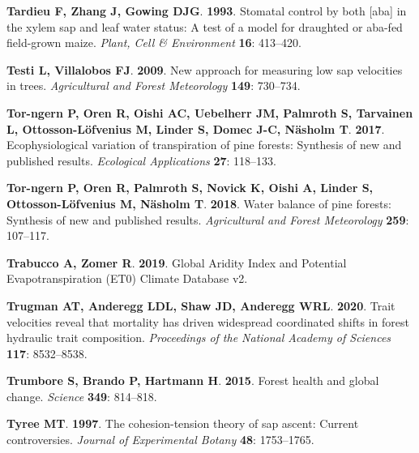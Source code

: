 \documentclass[11pt,twoside]{reedthesis}
\begin{document}
\hypertarget{ref-Tardieu1993}{}
\textbf{\textnormal{Tardieu F}, \textnormal{Zhang J}, \textnormal{Gowing
DJG}}. \textbf{1993}. Stomatal control by both {[}aba{]} in the xylem
sap and leaf water status: A test of a model for draughted or aba-fed
field-grown maize. \emph{Plant, Cell \& Environment} \textbf{16}:
413--420.

\hypertarget{ref-Testi2009}{}
\textbf{\textnormal{Testi L}, \textnormal{Villalobos FJ}}.
\textbf{2009}. New approach for measuring low sap velocities in trees.
\emph{Agricultural and Forest Meteorology} \textbf{149}: 730--734.

\hypertarget{ref-Tor-ngern2017}{}
\textbf{\textnormal{Tor-ngern P}, \textnormal{Oren R}, \textnormal{Oishi
AC}, \textnormal{Uebelherr JM}, \textnormal{Palmroth S},
\textnormal{Tarvainen L}, \textnormal{Ottosson-Löfvenius M},
\textnormal{Linder S}, \textnormal{Domec J-C}, \textnormal{Näsholm T}}.
\textbf{2017}. Ecophysiological variation of transpiration of pine
forests: Synthesis of new and published results. \emph{Ecological
Applications} \textbf{27}: 118--133.

\hypertarget{ref-Torngern2018}{}
\textbf{\textnormal{Tor-ngern P}, \textnormal{Oren R},
\textnormal{Palmroth S}, \textnormal{Novick K}, \textnormal{Oishi A},
\textnormal{Linder S}, \textnormal{Ottosson-Löfvenius M},
\textnormal{Näsholm T}}. \textbf{2018}. Water balance of pine forests:
Synthesis of new and published results. \emph{Agricultural and Forest
Meteorology} \textbf{259}: 107--117.

\hypertarget{ref-trabucco_global_2019}{}
\textbf{\textnormal{Trabucco A}, \textnormal{Zomer R}}. \textbf{2019}.
Global Aridity Index and Potential Evapotranspiration (ET0) Climate
Database v2.

\hypertarget{ref-trugman_trait_2020}{}
\textbf{\textnormal{Trugman AT}, \textnormal{Anderegg LDL},
\textnormal{Shaw JD}, \textnormal{Anderegg WRL}}. \textbf{2020}. Trait
velocities reveal that mortality has driven widespread coordinated
shifts in forest hydraulic trait composition. \emph{Proceedings of the
National Academy of Sciences} \textbf{117}: 8532--8538.

\hypertarget{ref-trumbore_forest_2015}{}
\textbf{\textnormal{Trumbore S}, \textnormal{Brando P},
\textnormal{Hartmann H}}. \textbf{2015}. Forest health and global
change. \emph{Science} \textbf{349}: 814--818.

\hypertarget{ref-Tyree1997}{}
\textbf{\textnormal{Tyree MT}}. \textbf{1997}. The cohesion-tension
theory of sap ascent: Current controversies. \emph{Journal of
Experimental Botany} \textbf{48}: 1753--1765.
\end{document}
